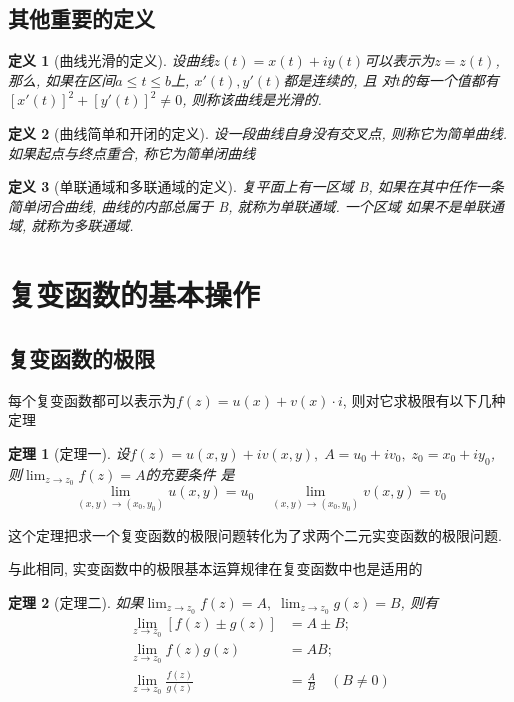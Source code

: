 \documentclass[12pt, a4paper, oneside]{ctexart}
\theoremstyle{plain}
\newtheorem{theorem}{定理}[section]
\newtheorem{definition}{定义}[section]
\theoremstyle{definition}
\theoremstyle{definition}
\begin{document}
\subsection{其他重要的定义}
\begin{definition}[曲线光滑的定义]

    设曲线$z(t)=x(t)+iy(t)$可以表示为$z=z(t)$, 那么, 如果在区间$a\leq t \leq b$上, $x'(t), y'(t)$都是连续的, 且
对$t$的每一个值都有$[x'(t)]^{2}+[y'(t)]^{2}\neq0$, 则称该曲线是光滑的.
\end{definition}


\begin{definition}[曲线简单和开闭的定义]
    设一段曲线自身没有交叉点, 则称它为简单曲线. 如果起点与终点重合, 称它为简单闭曲线
\end{definition}

\begin{definition}[单联通域和多联通域的定义]
    复平面上有一区域 B, 如果在其中任作一条简单闭合曲线, 曲线的内部总属于 B, 就称为单联通域. 一个区域
如果不是单联通域, 就称为多联通域.
\end{definition}

\section{复变函数的基本操作}
\subsection{复变函数的极限}

每个复变函数都可以表示为$f(z)=u(x)+v(x)\cdot i$, 则对它求极限有以下几种定理

\begin{theorem}[定理一]
    设$f(z)=u(x,y)+iv(x,y),\; A=u_{0}+iv_{0},\; z_{0}=x_{0}+iy_{0}$, 则$\lim_{z\to z_{0}}f(z)=A$的充要条件
    是
    \[
        \lim_{ (x,y)\to(x_{0},y_{0}) } u(x,y)=u_{0} \quad \lim_{(x,y)\to(x_{0},y_{0}) }v(x,y)=v_{0}
    \]
\end{theorem}

这个定理把求一个复变函数的极限问题转化为了求两个二元实变函数的极限问题.

与此相同, 实变函数中的极限基本运算规律在复变函数中也是适用的
\begin{theorem}[定理二]
    如果$\lim_{z\to z_{0}}f(z)=A,\;\lim_{z\to z_{0}}g(z)=B$, 则有
    \begin{align}
        \lim_{z\to z_{0}} [f(z)\pm g(z)] &= A \pm B; \\
        \lim_{z\to z_{0}} f(z)g(z) &= AB;\\
        \lim_{z\to z_{0}} \frac{f(z)}{g(z)} &= \frac{A}{B} \quad (B\neq0)
    \end{align}   

\end{theorem}
\end{document}
